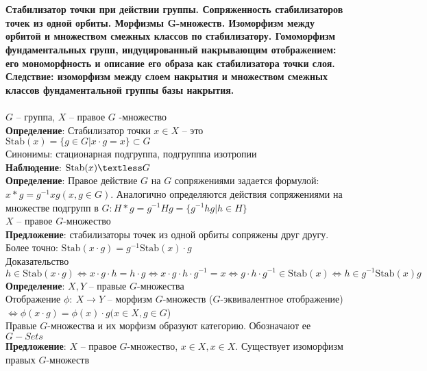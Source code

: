 \newpage
\section{}
	\textbf{Стабилизатор точки при действии группы. Сопряженность стабилизаторов точек из одной орбиты. Морфизмы G-множеств. Изоморфизм между орбитой и множеством смежных классов по стабилизатору. Гомоморфизм фундаментальных групп, индуцированный накрывающим отображением: его мономорфность и описание его образа как стабилизатора точки слоя. Следствие: изоморфизм между слоем накрытия и множеством смежных классов фундаментальной группы базы накрытия.}\\
	\\
	$G$ -- группа, $X$ -- правое $G$ -множество\\
	\textbf{Определение}: Стабилизатор точки $x\in X$ -- это $\text{Stab}(x) = \{g\in G| x\cdot g = x\} \subset G$\\
	Синонимы: стационарная подгруппа, подгрупппа изотропии\\
	\textbf{Наблюдение}: $\text{Stab}(x) \textless G$\\
	\textbf{Определение}: Правое действие $G$ на $G$ сопряжениями задается формулой: $x\ast g = g^{-1} xg (x,g\in G)$. Аналогично определяются действия сопряжениями на множестве подгрупп в $G: H\ast g = g^{-1} Hg = \{g^{-1} hg|h\in H\}$\\
	$X$ -- правое $G$-множество\\
	\textbf{Предложение}: стабилизаторы точек из одной орбиты сопряжены друг другу.\\
	Более точно: $\text{Stab}(x\cdot g) = g^{-1} \text{Stab}(x) \cdot g$\\
	Доказательство $h\in \text{Stab}(x\cdot g) \Leftrightarrow x\cdot g\cdot h = h\cdot g \Leftrightarrow x\cdot g\cdot h\cdot g^{-1} = x \Leftrightarrow g\cdot h\cdot g^{-1} \in \text{Stab}(x) \Leftrightarrow h\in g^{-1} \text{Stab}(x) g$\\
	\textbf{Определение}: $X, Y$ -- правые $G$-множества\\
	Отображение $\phi:\ X\rightarrow Y$ -- морфизм $G$-множеств ($G$-эквивалентное отображение) $\Leftrightarrow \phi (x\cdot g) = \phi (x) \cdot g (x\in X, g\in G$)\\
	Правые $G$-множества и их морфизм образуют категорию. Обозначают ее $G-Sets$\\
	\textbf{Предложение}: $X$ -- правое $G$-множество, $x\in X, x\in X$. Существует изоморфизм правых $G$-множеств\\
